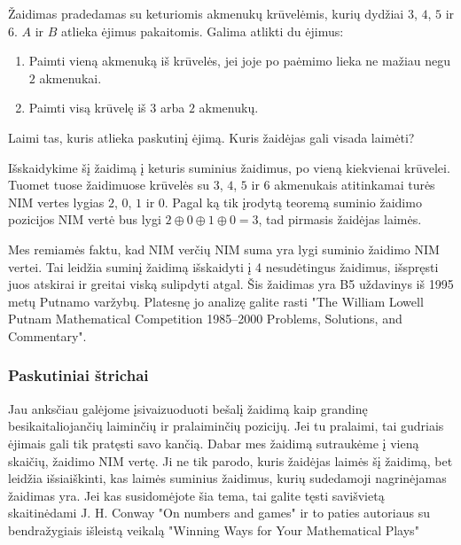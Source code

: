 \begin{pavnr}
  Žaidimas pradedamas su keturiomis akmenukų krūvelėmis, kurių dydžiai $3$,
  $4$, $5$ ir $6$. $A$ ir $B$ atlieka ėjimus pakaitomis. Galima atlikti du
  ėjimus:
  \begin{enumerate}
    \item Paimti vieną akmenuką iš krūvelės, jei joje po paėmimo lieka ne
      mažiau negu $2$ akmenukai.
    \item Paimti visą krūvelę iš $3$ arba $2$ akmenukų.
  \end{enumerate}
  Laimi tas, kuris atlieka paskutinį ėjimą. Kuris žaidėjas gali visada laimėti?
\end{pavnr}

\begin{sprendimas}
  Išskaidykime šį žaidimą į keturis suminius žaidimus, po vieną kiekvienai
  krūvelei. Tuomet tuose žaidimuose krūvelės su $3$, $4$, $5$ ir $6$
  akmenukais atitinkamai turės NIM vertes lygias $2$, $0$, $1$ ir $0$.
  Pagal ką tik įrodytą teoremą suminio žaidimo pozicijos NIM vertė bus lygi
  $2\oplus 0\oplus 1\oplus 0=3$, tad pirmasis žaidėjas laimės. 
\end{sprendimas}

\begin{pastaba}
  Mes remiamės faktu, kad NIM verčių NIM suma yra lygi suminio žaidimo NIM
  vertei. Tai leidžia suminį žaidimą išskaidyti į 4 nesudėtingus žaidimus,
  išspręsti juos atskirai ir greitai viską sulipdyti atgal. Šis žaidimas
  yra B5 uždavinys iš 1995 metų Putnamo varžybų. Platesnę jo analizę galite
  rasti "The William Lowell Putnam Mathematical Competition 1985–2000
  Problems, Solutions, and Commentary".
\end{pastaba}

\subsubsection{Paskutiniai štrichai}

Jau anksčiau galėjome įsivaizuoduoti bešalį žaidimą kaip grandinę
besikaitaliojančių laiminčių ir pralaiminčių pozicijų. Jei tu pralaimi, tai
gudriais ėjimais gali tik pratęsti savo kančią. Dabar mes žaidimą
sutraukėme į vieną skaičių, žaidimo NIM vertę. Ji ne tik parodo, kuris
žaidėjas laimės šį žaidimą, bet leidžia išsiaiškinti, kas laimės suminius
žaidimus, kurių sudedamoji nagrinėjamas žaidimas yra. Jei kas susidomėjote šia tema, tai galite tęsti savišvietą skaitinėdami J. H. Conway  "On numbers and games" ir to paties autoriaus su bendražygiais išleistą veikalą  "Winning Ways for Your Mathematical Plays"

